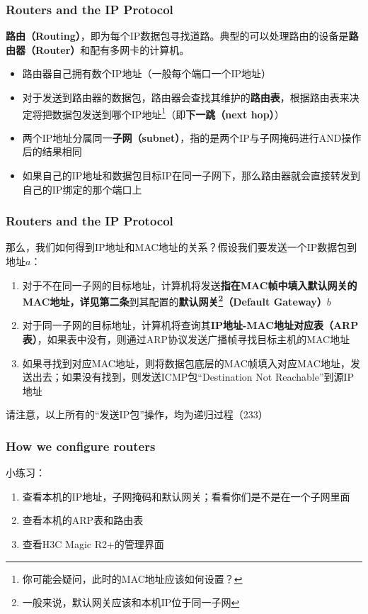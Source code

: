 \documentclass[11pt]{beamer}
\begin{document}
\begin{frame}
\frametitle{Routers and the IP Protocol}
\textbf{路由（Routing）}，即为每个IP数据包寻找道路。典型的可以处理路由的设备是\textbf{路由器（Router）}和配有多网卡的计算机。
\begin{itemize}
\item 路由器自己拥有数个IP地址（一般每个端口一个IP地址）
\item 对于发送到路由器的数据包，路由器会查找其维护的\textbf{路由表}，根据路由表来决定将把数据包发送到哪个IP地址\footnote{你可能会疑问，此时的MAC地址应该如何设置？}（即\textbf{下一跳（next hop）}）
\item 两个IP地址分属同一\textbf{子网（subnet）}，指的是两个IP与子网掩码进行AND操作后的结果相同
\item 如果自己的IP地址和数据包目标IP在同一子网下，那么路由器就会直接转发到自己的IP绑定的那个端口上
\end{itemize}
\end{frame}


\begin{frame}
\frametitle{Routers and the IP Protocol}
那么，我们如何得到IP地址和MAC地址的关系？假设我们要发送一个IP数据包到地址$a$：
\begin{enumerate}
\item 对于不在同一子网的目标地址，计算机将发送\textbf{指在MAC帧中填入默认网关的MAC地址，详见第二条}到其配置的\textbf{默认网关\footnote{一般来说，默认网关应该和本机IP位于同一子网}（Default Gateway）}$b$
\item 对于同一子网的目标地址，计算机将查询其\textbf{IP地址-MAC地址对应表（ARP表）}，如果表中没有，则通过ARP协议发送广播帧寻找目标主机的MAC地址
\item 如果寻找到对应MAC地址，则将数据包底层的MAC帧填入对应MAC地址，发送出去；如果没有找到，则发送ICMP包“Destination Not Reachable”到源IP地址
\end{enumerate}
请注意，以上所有的“发送IP包”操作，均为递归过程（233）
\end{frame}

\begin{frame}
\frametitle{How we configure routers}
小练习：
\begin{enumerate}
\item 查看本机的IP地址，子网掩码和默认网关；看看你们是不是在一个子网里面
\item 查看本机的ARP表和路由表
\item 查看H3C Magic R2+的管理界面
\end{enumerate}
\end{frame}
\end{document}
